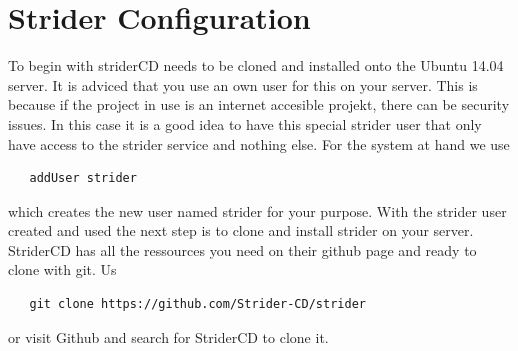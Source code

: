 \section{Strider Configuration}
\label{section:Strider Configuration}
To begin with striderCD needs to be cloned and installed onto the Ubuntu 14.04 server. It is adviced that you use an own user for this
on your server. This is because if the project in use is an internet accesible projekt, there can be security issues. In this case
it is a good idea to have this special strider user that only have access to the strider service and nothing else. For the system at
hand we use
\begin{lstlisting}
   addUser strider
\end{lstlisting}
which creates the new user named strider for your purpose. With the strider user created and used the next step is to clone and install
strider on your server. StriderCD has all the ressources you need on their github page and ready to clone with git. Us
\begin{lstlisting}
   git clone https://github.com/Strider-CD/strider
\end{lstlisting}
or visit Github and search for StriderCD to clone it.

